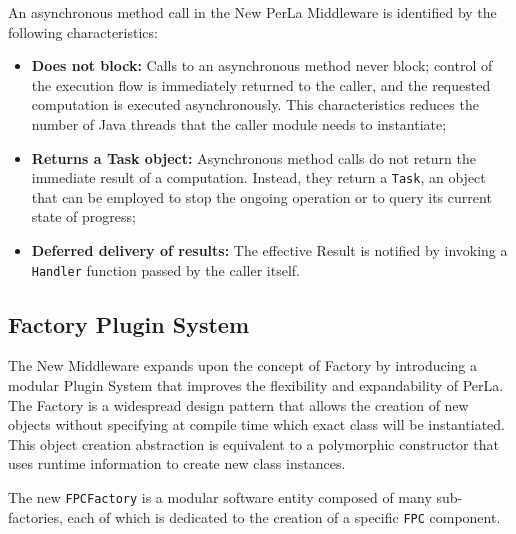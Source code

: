 An asynchronous method call in the New PerLa Middleware is identified by the
following characteristics:

\begin{itemize}

    \item \textbf{Does not block:} Calls to an asynchronous method never block;
        control of the execution flow is immediately returned to the caller,
        and the requested computation is executed asynchronously. This
        characteristics reduces the number of Java threads that the caller
        module needs to instantiate;

    \item \textbf{Returns a Task object:} Asynchronous method calls do not
        return the immediate result of a computation. Instead, they return a
        \texttt{Task}, an object that can be employed to stop the ongoing
        operation or to query its current state of progress;

    \item \textbf{Deferred delivery of results:} The effective Result is
        notified by invoking a \texttt{Handler} function passed by the caller
        itself.

\end{itemize}

\subsection{Factory Plugin System}
\label{sec:newmiddleware.factory}

The New Middleware expands upon the concept of Factory by
introducing a modular Plugin System that improves the flexibility and
expandability of PerLa. The Factory is a widespread design pattern that allows
the creation of new objects without specifying at compile time which exact
class will be instantiated. This object creation abstraction is equivalent to a
polymorphic constructor that uses runtime information to create new class
instances.

The new \texttt{FPCFactory} is a modular software entity composed of many
sub-factories, each of which is dedicated to the creation of a specific
\texttt{FPC} component.
